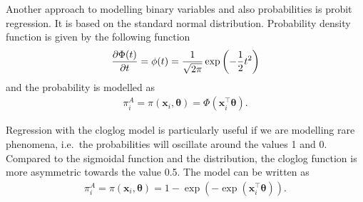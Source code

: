 \documentclass[
]{jss}
\begin{document}
Another approach to modelling binary variables and also probabilities is
probit regression. It is based on the standard normal distribution.
Probability density function is given by the following function
\begin{displaymath}
    \pdv{\Phi(t)}{t}=\phi(t)=\frac{1}{\sqrt{2 \pi}} \exp \left(-\frac{1}{2} t^2\right)
\end{displaymath} and the probability is modelled as \begin{align*}
    \pi_{i}^{A} = \pi(\boldsymbol{x}_{i},\boldsymbol{\theta}) = \Phi(\boldsymbol{x}_{i}^{\top}\boldsymbol{\theta}).
\end{align*}

Regression with the cloglog model is particularly useful if we are
modelling rare phenomena, i.e.~the probabilities will oscillate around
the values 1 and 0. Compared to the sigmoidal function and the
distribution, the cloglog function is more asymmetric towards the value
0.5. The model can be written as \begin{align*}
    \pi_i^A = \pi(\boldsymbol{x}_{i}, \boldsymbol{\theta}) = 1 - \exp(-\exp(\boldsymbol{x}_{i}^{\top}\boldsymbol{\theta})).
\end{align*}
\end{document}
